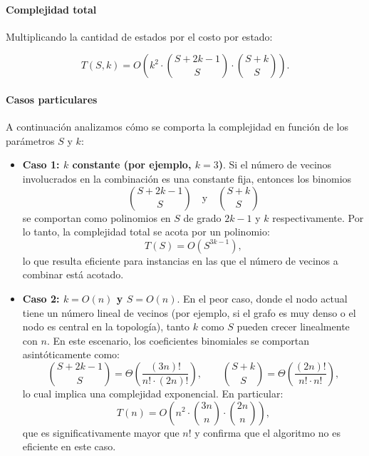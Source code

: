 \paragraph{Complejidad total}

Multiplicando la cantidad de estados por el costo por estado:

\[
T(S, k) = O\left(
    k^2\cdot
    \binom{S + 2k - 1}{S} \cdot
    \binom{S + k}{S}
\right).
\]

\paragraph{Casos particulares}

A continuación analizamos cómo se comporta la complejidad en función de los parámetros $S$ y $k$:

\begin{itemize}
    \item \textbf{Caso 1: $k$ constante (por ejemplo, $k = 3$)}.  
    Si el número de vecinos involucrados en la combinación es una constante fija, entonces los binomios
    \[
    \binom{S + 2k - 1}{S} \quad \text{y} \quad \binom{S + k}{S}
    \]
    se comportan como polinomios en $S$ de grado $2k - 1$ y $k$ respectivamente. Por lo tanto, la complejidad total se acota por un polinomio:
    \[
    T(S) = O\left(S^{3k - 1}\right),
    \]
    lo que resulta eficiente para instancias en las que el número de vecinos a combinar está acotado.

    \item \textbf{Caso 2: $k = O(n)$ y $S = O(n)$}.  
    En el peor caso, donde el nodo actual tiene un número lineal de vecinos (por ejemplo, si el grafo es muy denso o el nodo es central en la topología), tanto $k$ como $S$ pueden crecer linealmente con $n$. En este escenario, los coeficientes binomiales se comportan asintóticamente como:
    \[
    \binom{S + 2k - 1}{S} = \Theta\left( \frac{(3n)!}{n! \cdot (2n)!} \right),
    \qquad
    \binom{S + k}{S} = \Theta\left( \frac{(2n)!}{n! \cdot n!} \right),
    \]
    lo cual implica una complejidad exponencial. En particular:
    \[
    T(n) = O\left( n^2 \cdot \binom{3n}{n} \cdot \binom{2n}{n} \right),
    \]
    que es significativamente mayor que $n!$ y confirma que el algoritmo no es eficiente en este caso. 
\end{itemize}



